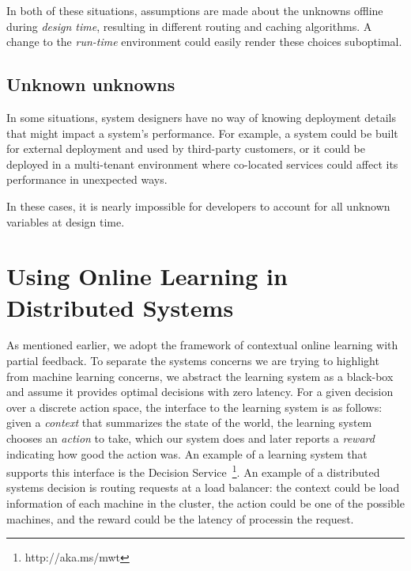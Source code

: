 \documentclass[a4paper,twocolumn]{article}
\newcommand{\ignore}[1]{}
\begin{document}
In both of these situations, assumptions are made about the unknowns offline during
\emph{design time}, resulting in different routing and caching algorithms. A change to
the \emph{run-time} environment could easily render these choices suboptimal.

\ignore{
Online learning has the potential to make these decisions online, based on current contexts,
and can be nimble in adapting to any changes to the run-time
environment.
}

\subsection*{Unknown unknowns}

In some situations, system designers have no way of knowing deployment details
that might impact a system's performance. For example, a system could be
built for external deployment and used by third-party customers, or it could be
deployed in a multi-tenant environment where co-located services could
affect its performance in unexpected ways. 

In these cases, it is nearly impossible for developers to account for all 
unknown variables at design time. 

\ignore{
However, an ML agent is able to make
decisions online based on inputs from the run-time environment.
}
\ignore{
To be clear, ML has been used in some distributed systems. However, it has not
been used in a general way to make online decisions about core distributed
systems implementation details. We advocate that developers should focus on
high-level objectives of their system, and use online ML to make to compute the
specifics (such as policies for request routing, replica placement, or failure
monitoring) at run-time based on observed metrics.
}

\section{Using Online Learning in Distributed Systems}

As mentioned earlier, we adopt the framework of contextual online learning
with partial feedback.  To separate the systems concerns we are trying to
highlight from machine learning concerns, we abstract the learning system as a
black-box and assume it provides optimal decisions with zero latency. For a
given decision over a discrete action space, the interface to the learning
system is as follows: given a {\em context} that summarizes the state of the
world, the learning system chooses an {\em action} to take, which our system
does and later reports a {\em reward} indicating how good the action was. An
example of a learning system that supports this interface is the Decision
Service~\footnote{http://aka.ms/mwt}. An example of a distributed systems
decision is routing requests at a load balancer: the context could be load
information of each machine in the cluster, the action could be one of the
possible machines, and the reward could be the latency of processin the request.
\end{document}
